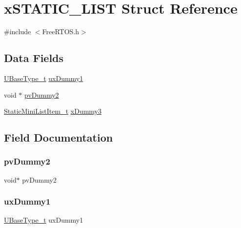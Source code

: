 \hypertarget{structx_s_t_a_t_i_c___l_i_s_t}{}\section{x\+S\+T\+A\+T\+I\+C\+\_\+\+L\+I\+ST Struct Reference}
\label{structx_s_t_a_t_i_c___l_i_s_t}


{\ttfamily \#include $<$Free\+R\+T\+O\+S.\+h$>$}

\subsection*{Data Fields}
\begin{DoxyCompactItemize}
\item 
\mbox{\hyperlink{portmacro_8h_a646f89d4298e4f5afd522202b11cb2e6}{U\+Base\+Type\+\_\+t}} \mbox{\hyperlink{structx_s_t_a_t_i_c___l_i_s_t_a721a2d25ba03ddd0abfcf3d9336e8f12}{ux\+Dummy1}}
\item 
void $\ast$ \mbox{\hyperlink{structx_s_t_a_t_i_c___l_i_s_t_a44b3b17a1410a0bcec9b416f2bc89a96}{pv\+Dummy2}}
\item 
\mbox{\hyperlink{_free_r_t_o_s_8h_a9097f48f4dfa56e8e01d9179462c7994}{Static\+Mini\+List\+Item\+\_\+t}} \mbox{\hyperlink{structx_s_t_a_t_i_c___l_i_s_t_a22f81ad5d2e6efe9c850330af339ac02}{x\+Dummy3}}
\end{DoxyCompactItemize}


\subsection{Field Documentation}
\mbox{\label{structx_s_t_a_t_i_c___l_i_s_t_a44b3b17a1410a0bcec9b416f2bc89a96}} 
\subsubsection{\texorpdfstring{pvDummy2}{pvDummy2}}
{\footnotesize\ttfamily void$\ast$ pv\+Dummy2}

\mbox{\label{structx_s_t_a_t_i_c___l_i_s_t_a721a2d25ba03ddd0abfcf3d9336e8f12}} 
\subsubsection{\texorpdfstring{uxDummy1}{uxDummy1}}
{\footnotesize\ttfamily \mbox{\hyperlink{portmacro_8h_a646f89d4298e4f5afd522202b11cb2e6}{U\+Base\+Type\+\_\+t}} ux\+Dummy1}

